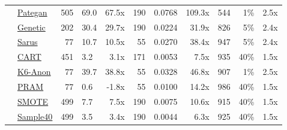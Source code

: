 \begin{table}
\begin{tabular}{llrlr@{\hskip 10pt}r@{\hskip 6pt}l@{\hskip 6pt}r@{\hskip 10pt}r@{\hskip 6pt}r@{\hskip 6pt}r}
        \cellcolor{ForestGreen} & \href{https://htmlpreview.github.io/?https://github.com/yoid2000/sdnist-summary/blob/main/results/pategan_n_iter_50_e_10_all/report.html}{Pategan} & 505 & 69.0 & 67.5x & 190 & 0.0768 & 109.3x & 544 & 1\% & 2.5x \\
        \cellcolor{YellowGreen} & \href{https://htmlpreview.github.io/?https://github.com/yoid2000/sdnist-summary/blob/main/results/genetic_sd_e_10_simple/report.html}{Genetic} & 202 & 30.4 & 29.7x & 190 & 0.0224 & 31.9x & 826 & 5\% & 2.4x \\
        \cellcolor{YellowGreen} & \href{https://htmlpreview.github.io/?https://github.com/yoid2000/sdnist-summary/blob/main/results/sarus_sdg_demographic/report.html}{Sarus} & 77 & 10.7 & 10.5x & 55 & 0.0270 & 38.4x & 947 & 5\% & 2.4x \\
        \cellcolor{SkyBlue} & \href{https://htmlpreview.github.io/?https://github.com/yoid2000/sdnist-summary/blob/main/results/cart_cf21/report.html}{CART} & 451 & 3.2 & 3.1x & 171 & 0.0053 & 7.5x & 935 & 40\% & 1.5x \\
        \cellcolor{pink} & \href{https://htmlpreview.github.io/?https://github.com/yoid2000/sdnist-summary/blob/main/results/k_anonymity_k_6/report.html}{K6-Anon} & 77 & 39.7 & 38.8x & 55 & 0.0328 & 46.8x & 907 & 1\% & 2.5x \\
        \cellcolor{Tan} & \href{https://htmlpreview.github.io/?https://github.com/yoid2000/sdnist-summary/blob/main/results/pram_default/report.html}{PRAM} & 77 & 0.6 & -1.8x & 55 & 0.0100 & 14.2x & 986 & 40\% & 1.5x \\
        \cellcolor{Sepia} & \href{https://htmlpreview.github.io/?https://github.com/yoid2000/sdnist-summary/blob/main/results/smote_target_marital/report.html}{SMOTE} & 499 & 7.7 & 7.5x & 190 & 0.0075 & 10.6x & 915 & 40\% & 1.5x \\
        \cellcolor{Sepia} & \href{https://htmlpreview.github.io/?https://github.com/yoid2000/sdnist-summary/blob/main/results/subsample_40pcnt_all/report.html}{Sample40} & 499 & 3.5 & 3.4x & 190 & 0.0044 & 6.3x & 925 & 40\% & 1.5x \\
        \bottomrule
    \end{tabular}
\end{table}
